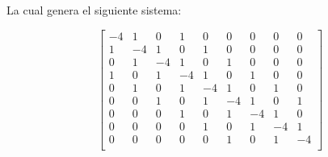 La cual genera el siguiente sistema:

\[
    \begin{bmatrix}
        -4 & 1 & 0 & 1 & 0 & 0 & 0 & 0 & 0 \\
        1 & -4 & 1 & 0 & 1 & 0 & 0 & 0 & 0 \\
        0 & 1 & -4 & 1 & 0 & 1 & 0 & 0 & 0 \\
        1 & 0 & 1 & -4 & 1 & 0 & 1 & 0 & 0 \\
        0 & 1 & 0 & 1 & -4 & 1 & 0 & 1 & 0 \\
        0 & 0 & 1 & 0 & 1 & -4 & 1 & 0 & 1 \\
        0 & 0 & 0 & 1 & 0 & 1 & -4 & 1 & 0 \\
        0 & 0 & 0 & 0 & 1 & 0 & 1 & -4 & 1 \\
        0 & 0 & 0 & 0 & 0 & 1 & 0 & 1 & -4 \\
    \end{bmatrix}
\]